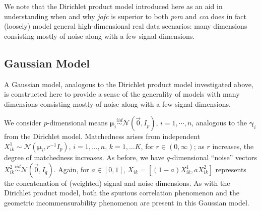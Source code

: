 \documentclass[12pt,xcolor]{article}
\newcommand{\1}{\ensuremath{\mbox{{\bf 1}}}}
\newcommand{\iid}{\stackrel{iid}{\sim}}
\begin{document}
We note that the Dirichlet product model introduced here as an aid in understanding
when and why {\em jofc} is superior to both {\it p}$\circ${\it m} and {\em cca}
does in fact (loosely) model general high-dimensional real data scenarios:
many dimensions consisting mostly of noise along with a few signal dimensions.

\subsection{Gaussian Model}

A Gaussian model, analogous to the Dirichlet product model investigated above,
is constructed here to provide a sense of the generality of models
with many dimensions consisting mostly of noise along with a few signal dimensions.

We consider $p$-dimensional means $\bm{\mu}_{i}\iid\mathcal{N}\left(\vec{0},I_p\right)$, $i=1,\cdots,n$,
analogous to the $\bm{\gamma}_i$ from the Dirichlet model.
Matchedness arises from independent $X^1_{ik} \sim\mathcal{N}\left(\bm{\mu}_{i},r^{-1}I_p\right)$, $i=1,\ldots,n$, $k=1,\ldots K$,
for $r \in (0,\infty)$;
as $r$ increases, the degree of matchedness increases.
As before, we have $q$-dimensional ``noise'' vectors
$X^2_{ik} \iid \mathcal{N}\left(\vec{0},I_{q}\right)$.
Again, for $a \in [0,1]$, $X_{ik} = [(1-a) X^1_{ik} , a X^2_{ik}]$
represents the concatenation of (weighted) signal and noise dimensions.
As with the Dirichlet product model,
both the spurious correlation phenomenon
and the geometric incommensurability phenomenon are present in this Gaussian model.

\begin{comment}
  The \dots
In this case, the parameter $r$ controlling the degree of matchedness of the matched pairs
specifies the largest eigenvalue of $\Sigma$;
the remaining $p-1$ eigenvalues are independent and identically distributed Uniform$(0,r)$.
We consider means $\mu_{i}\iid\mathcal{N}\left(\vec{0},\Sigma\right)$, $i=1,\cdots,n$,
analogous to the $\bm{\gamma}_i$ from the Dirichlet model.
Matchedness arises from $X^1_{ik} \sim\mathcal{N}\left(\mu_{i},I_{p}\right)$, $i=1,\ldots,n$, $k=1,\ldots K=2$.
As $r$ increases, the degree of matchedness increases since the covariance
matrix for $X^1_{ik}|\mu_i$ (the identity matrix $I_{p}$) remains fixed
while the maximum eigenvalue of $\Sigma$ increases with $r$.
For the spurious correlation phenomenon, $q$-dimensional ``noise'' vectors
$X^2_{ik}$ are generated iid $\mathcal{N}\left(\vec{0},I_{q}\right)$.
Again, for $a \in [0,1]$, $X_{ik} = [(1-a) X^1_{ik} , a X^2_{ik}]$
represents the concatenation of (weighted) signal and noise dimensions.
\end{comment}
\end{document}

